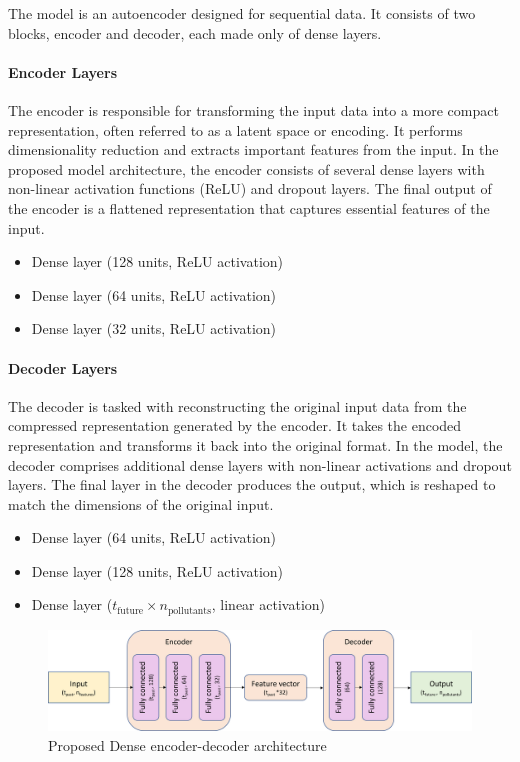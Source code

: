 The model is an autoencoder designed for sequential data. It consists of two blocks, encoder and decoder, each made only of dense layers.

\paragraph*{Encoder Layers}
The encoder is responsible for transforming the input data into a more compact representation, often referred to as a latent space or encoding. It performs dimensionality reduction and extracts important features from the input. In the proposed model architecture, the encoder consists of several dense layers with non-linear activation functions (ReLU) and dropout layers. The final output of the encoder is a flattened representation that captures essential features of the input.
\begin{itemize}[noitemsep]
  \item Dense layer (128 units, ReLU activation)
  \item Dense layer (64 units, ReLU activation)
  \item Dense layer (32 units, ReLU activation)
\end{itemize}

\paragraph*{Decoder Layers}
The decoder is tasked with reconstructing the original input data from the compressed representation generated by the encoder. It takes the encoded representation and transforms it back into the original format. In the model, the decoder comprises additional dense layers with non-linear activations and dropout layers. The final layer in the decoder produces the output, which is reshaped to match the dimensions of the original input.
\begin{itemize}[noitemsep]
  \item Dense layer (64 units, ReLU activation)
  \item Dense layer (128 units, ReLU activation)
  \item Dense layer (\( t_{\text{future}} \times n_{\text{pollutants}} \), linear activation)
\end{itemize}

\begin{figure}
    \centering
    \includegraphics[width=1\linewidth]{images/model architectures/denseencdecmodel.png}
    \caption{Proposed Dense encoder-decoder architecture}
    \label{fig:denseencdecmodel}
\end{figure}

